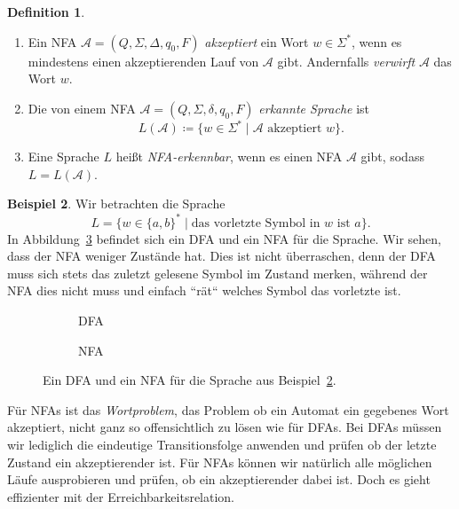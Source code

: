 \documentclass[11pt, a4paper]{article}
\theoremstyle{definition}
\newtheorem{definition}{Definition}[section]
\newtheorem{example}[definition]{Beispiel}
\theoremstyle{plain}
\numberwithin{equation}{section}
\begin{document}
\begin{definition}
\
	\begin{enumerate}
		\item Ein NFA \( \mathcal{A} = (Q, \Sigma, \Delta, q_0, F) \) \textit{akzeptiert} ein Wort \( w \in \Sigma^\ast \), wenn es mindestens einen akzeptierenden Lauf von \( \mathcal{A} \) gibt. Andernfalls \textit{verwirft} \( \mathcal{A} \) das Wort \( w \).
		\item Die von einem NFA \( \mathcal{A} = (Q, \Sigma, \delta, q_0, F) \) \textit{erkannte Sprache} ist
			\[
				L(\mathcal{A}) \coloneqq \{ w \in \Sigma^\ast \mid \mathcal{A} \text{ akzeptiert } w \}.
			\]
		\item Eine Sprache \( L \) heißt \textit{NFA-erkennbar}, wenn es einen NFA \( \mathcal{A} \) gibt, sodass \( L = L(\mathcal{A}) \).
	\end{enumerate}
\end{definition}
\begin{example}\label{exp:ex2}
	Wir betrachten die Sprache
	\[
		L = \{ w \in \{a, b\}^\ast \mid \text{das vorletzte Symbol in } w \text{ ist } a \}.
	\]
	In Abbildung~\ref{fig:nfa_ex1} befindet sich ein DFA und ein NFA für die Sprache. Wir sehen, dass der NFA weniger Zustände hat. Dies ist nicht überraschen, denn der DFA muss sich stets das zuletzt gelesene Symbol im Zustand merken, während der NFA dies nicht muss und einfach ``rät`` welches Symbol das vorletzte ist.
\end{example}
\begin{figure}
	\centering
	\begin{subfigure}[b]{.49\textwidth}
		\centering
		
		\caption{DFA}
		\label{fig:nfa_ex1dfa}
	\end{subfigure}
	\begin{subfigure}[b]{.49\textwidth}
		\centering
		
		\caption{NFA}
		\label{fig:nfa_ex1nfa}
	\end{subfigure}
	\caption{Ein DFA und ein NFA für die Sprache aus Beispiel~\ref{exp:ex2}.}
	\label{fig:nfa_ex1}
\end{figure}
Für NFAs ist das \textit{Wortproblem}, das Problem ob ein Automat ein gegebenes Wort akzeptiert, nicht ganz so offensichtlich zu lösen wie für DFAs. Bei DFAs müssen wir lediglich die eindeutige Transitionsfolge anwenden und prüfen ob der letzte Zustand ein akzeptierender ist. Für NFAs können wir natürlich alle möglichen Läufe ausprobieren und prüfen, ob ein akzeptierender dabei ist. Doch es gieht effizienter mit der Erreichbarkeitsrelation.
\end{document}
